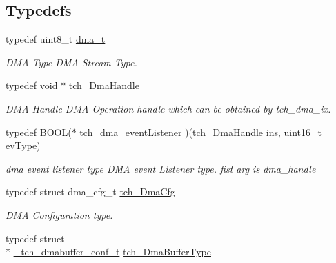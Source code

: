 \subsection*{Typedefs}
\begin{DoxyCompactItemize}
\item 
\hypertarget{group___d_m_a___h_a_l_ga15fec033c1f956ff5c0dab218a0c7030}{typedef uint8\+\_\+t \hyperlink{group___d_m_a___h_a_l_ga15fec033c1f956ff5c0dab218a0c7030}{dma\+\_\+t}}\label{group___d_m_a___h_a_l_ga15fec033c1f956ff5c0dab218a0c7030}

\begin{DoxyCompactList}\small\item\em D\+M\+A Type D\+M\+A Stream Type. \end{DoxyCompactList}\item 
\hypertarget{group___d_m_a___h_a_l_ga962a733c1275269c8a3e976ee080bd41}{typedef void $\ast$ \hyperlink{group___d_m_a___h_a_l_ga962a733c1275269c8a3e976ee080bd41}{tch\+\_\+\+Dma\+Handle}}\label{group___d_m_a___h_a_l_ga962a733c1275269c8a3e976ee080bd41}

\begin{DoxyCompactList}\small\item\em D\+M\+A Handle D\+M\+A Operation handle which can be obtained by tch\+\_\+dma\+\_\+ix. \end{DoxyCompactList}\item 
\hypertarget{group___d_m_a___h_a_l_gae8d55e17759ef7184209c61754a02db2}{typedef B\+O\+O\+L($\ast$ \hyperlink{group___d_m_a___h_a_l_gae8d55e17759ef7184209c61754a02db2}{tch\+\_\+dma\+\_\+event\+Listener} )(\hyperlink{group___d_m_a___h_a_l_ga962a733c1275269c8a3e976ee080bd41}{tch\+\_\+\+Dma\+Handle} ins, uint16\+\_\+t ev\+Type)}\label{group___d_m_a___h_a_l_gae8d55e17759ef7184209c61754a02db2}

\begin{DoxyCompactList}\small\item\em dma event listener type D\+M\+A event Listener type. fist arg is dma\+\_\+handle \end{DoxyCompactList}\item 
\hypertarget{group___d_m_a___h_a_l_ga728acacb6f6c8e5ca08066500cffab4f}{typedef struct dma\+\_\+cfg\+\_\+t \hyperlink{group___d_m_a___h_a_l_ga728acacb6f6c8e5ca08066500cffab4f}{tch\+\_\+\+Dma\+Cfg}}\label{group___d_m_a___h_a_l_ga728acacb6f6c8e5ca08066500cffab4f}

\begin{DoxyCompactList}\small\item\em D\+M\+A Configuration type. \end{DoxyCompactList}\item 
\hypertarget{group___d_m_a___h_a_l_gacb9669c987f81fb6a001e47840c24d7c}{typedef struct \\*
\hyperlink{struct__tch__dmabuffer__conf__t}{\+\_\+tch\+\_\+dmabuffer\+\_\+conf\+\_\+t} \hyperlink{group___d_m_a___h_a_l_gacb9669c987f81fb6a001e47840c24d7c}{tch\+\_\+\+Dma\+Buffer\+Type}}\label{group___d_m_a___h_a_l_gacb9669c987f81fb6a001e47840c24d7c}


\end{DoxyCompactItemize}

